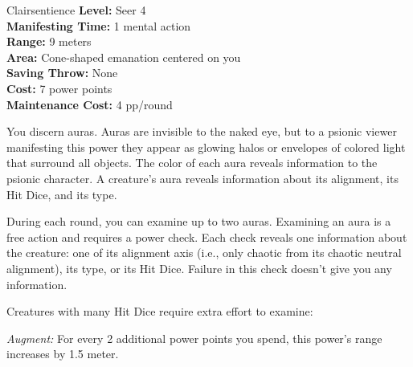 {Clairsentience}
{
	\textbf{Level:}
	Seer 4\\
	\textbf{Manifesting Time:}
	1 mental action\\
	\textbf{Range:}
	9 meters\\
	\textbf{Area:}
	Cone-shaped emanation centered on you\\
	\textbf{Saving Throw:}
	None\\
	\textbf{Cost:}
	7 power points\\
	\textbf{Maintenance Cost:}
	4 pp/round\\
}
{
	You discern auras. Auras are invisible to the naked eye, but to a psionic viewer manifesting this power they appear as glowing halos or envelopes of colored light that surround all objects. The color of each aura reveals information to the psionic character. A creature's aura reveals information about its alignment, its Hit Dice, and its type.

	During each round, you can examine up to two auras. Examining an aura is a free action and requires a power check. Each check reveals one information about the creature: one of its alignment axis (i.e., only chaotic from its chaotic neutral alignment), its type, or its Hit Dice. Failure in this check doesn't give you any information.

	Creatures with many Hit Dice require extra effort to examine:


	\textit{Augment:} For every 2 additional power points you spend, this power's range increases by 1.5 meter.
}